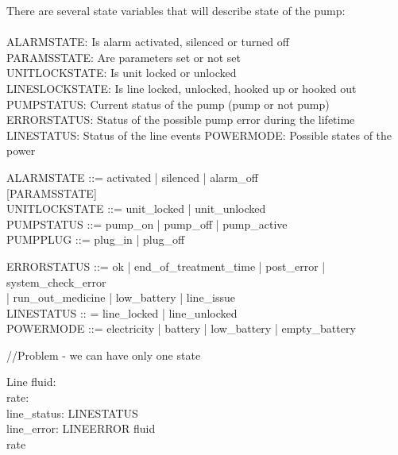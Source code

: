 \documentclass{article}
\begin{document}
	
	There are several state variables that will describe state of the pump:\\
	\\
	
	ALARMSTATE: Is alarm activated, silenced or turned off\\
	PARAMSSTATE: Are parameters set or not set\\
	UNITLOCKSTATE: Is unit locked or unlocked \\
	LINESLOCKSTATE: Is line locked, unlocked, hooked up or hooked out\\
	PUMPSTATUS: Current status of the pump (pump or not pump)\\
	ERRORSTATUS: Status of the possible pump error during the lifetime\\
	LINESTATUS: Status of the line events
	POWERMODE: Possible states of the power
	
	\begin{zed}	
		
		
		ALARMSTATE ::= activated | silenced | alarm\_off \\
		
		[PARAMSSTATE] \\ %
	
		UNITLOCKSTATE ::= unit\_locked | unit\_unlocked \\
	
		PUMPSTATUS ::= pump\_on | pump\_off | pump\_active \\
		
		PUMPPLUG ::=  plug\_in | plug\_off
		
		ERRORSTATUS ::= ok | end\_of\_treatment\_time | post\_error | system\_check\_error \\ | run\_out\_medicine | low\_battery | line\_issue \\
		
		LINESTATUS :: = line\_locked | line\_unlocked \\
		
		POWERMODE ::= electricity | battery | low\_battery | empty\_battery \\
	\end{zed}
	
	//Problem - we can have only one state
	
	\begin{schema}{Line}
		fluid: \nat \\
		rate: \nat \\
		line\_status: LINESTATUS \\
		line\_error: LINEERROR
	\where
		fluid  \\ 
		rate 
	\end{schema}
	
\end{document}
